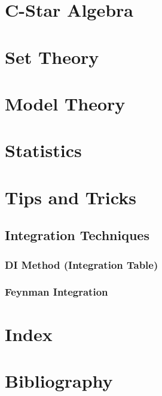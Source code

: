 \documentclass[12pt, english]{book}
\begin{document}
	\part{C-Star Algebra} \label{C-Star Algebra Part}
	
	\part{Set Theory} \label{Set Theory Part}
	
	\part{Model Theory} \label{Model Theory Part}
	
	\part{Statistics} \label{Statistics Part}
	\part{Tips and Tricks} \label{Tips and Tricks Part}
	
	\chapter{Integration Techniques} \label{Integration Techniques Chapter - Tips and Tricks}
	
	\section{DI Method (Integration Table)} \label{DI Method Section - Tips and Tricks}
	
	\section{Feynman Integration} \label{Feynman Integration Section - Tips and Tricks}
	
	\backmatter
	\part{Index} \label{Index Part}
	
	\part{Bibliography}
	
	\typeout{}
	
	
\end{document}
